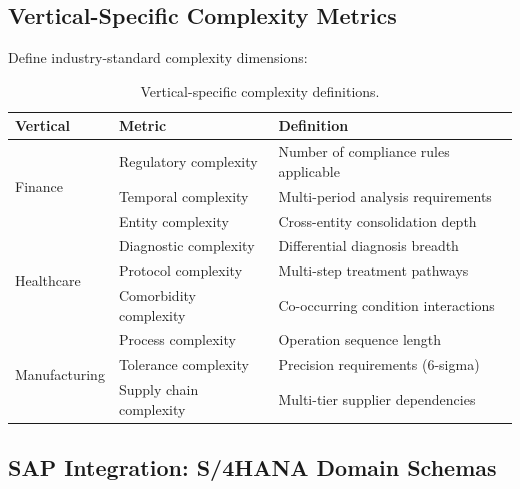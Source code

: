 \subsection{Vertical-Specific Complexity Metrics}

Define industry-standard complexity dimensions:

\begin{table}[htbp]
\centering
\caption{Vertical-specific complexity definitions.}
\label{tab:vertical-complexity}
\footnotesize
\begin{tabularx}{\textwidth}{@{}l l X@{}}
\toprule
\textbf{Vertical} & \textbf{Metric} & \textbf{Definition} \\
\midrule
\multirow{3}{*}{Finance} 
  & Regulatory complexity & Number of compliance rules applicable \\
  & Temporal complexity & Multi-period analysis requirements \\
  & Entity complexity & Cross-entity consolidation depth \\
\midrule
\multirow{3}{*}{Healthcare}
  & Diagnostic complexity & Differential diagnosis breadth \\
  & Protocol complexity & Multi-step treatment pathways \\
  & Comorbidity complexity & Co-occurring condition interactions \\
\midrule
\multirow{3}{*}{Manufacturing}
  & Process complexity & Operation sequence length \\
  & Tolerance complexity & Precision requirements (6-sigma) \\
  & Supply chain complexity & Multi-tier supplier dependencies \\
\bottomrule
\end{tabularx}
\end{table}

\subsection{SAP Integration: S/4HANA Domain Schemas}

